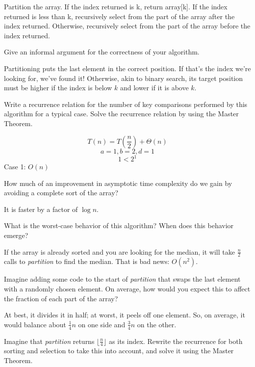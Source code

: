 \documentclass{tufte-handout}
\begin{document}
\begin{questions}
{\color{red} 
Partition the array. 
If the index returned is k, return array[k].
If the index returned is less than k, recursively select from the part of the array after the index returned. Otherwise, recursively select from the part of the array before the index returned.
}


\item Give an informal argument for the correctness of your algorithm.

{\color{red} 
Partitioning puts the last element in the correct position. If that's the index we're looking for, we've found it! Otherwise, akin to binary search, its target position must be higher if the index is below $k$ and lower if it is above $k$.
}

\item Write a recurrence relation for the number of key comparisons performed by this algorithm for a typical case. Solve the recurrence relation by using the Master Theorem.

{\color{red} 
\[ T(n) = T(\frac{n}{2}) + \Theta(n) \]
\[a = 1, b = 2, d = 1\] 
\[1 < 2^1\]
Case 1: $O(n)$
}

\item How much of an improvement in asymptotic time complexity do we gain by avoiding a complete sort of the array?

{\color{red} 
It is faster by a factor of $\log n$.
}

\item What is the worst-case behavior of this algorithm? When does this behavior emerge? 

{\color{red} 
If the array is already sorted and you are looking for the median, it will take $\frac{n}{2}$ calls to \emph{partition} to find the median. That is bad news: $O(n^2)$.
}

\item Imagine adding some code to the start of \emph{partition} that swaps the last element with a randomly chosen element. On average, how would you expect this to affect the fraction of each part of the array?

{\color{red} At best, it divides it in half; at worst, it peels off one element. So, on average, it would balance about $\frac{1}{4}n$ on one side and $\frac{3}{4}n$ on the other.}

\item Imagine that \emph{partition} returns $\lfloor \frac{n}{4} \rfloor$ as its index. Rewrite the recurrence for both sorting and selection to take this into account, and solve it using the Master Theorem.


\end{questions}
\end{document}
